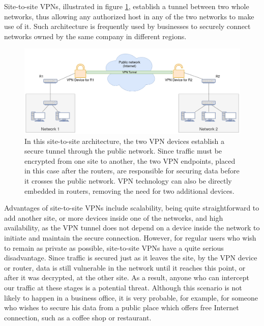 \documentclass[a4paper,12pt]{report}
\begin{document}
		Site-to-site VPNs, illustrated in figure \ref{fig:site-to-site_VPN}, establish a tunnel between two whole networks, thus allowing any authorized host in any of the two networks to make use of it. Such architecture is frequently used by businesses to securely connect networks owned by the same company in different regions.
		\begin{figure}[h]
			\includegraphics[width=\textwidth]{site-to-site_VPN}
			\centering
			\caption{In this site-to-site architecture, the two VPN devices establish a secure tunnel through the public network. Since traffic must be encrypted from one site to another, the two VPN endpoints, placed in this case after the routers, are responsible for securing data before it crosses the public network. VPN technology can also be directly embedded in routers, removing the need for two additional devices.}
			\label{fig:site-to-site_VPN}
		\end{figure}
		
		Advantages of site-to-site VPNs include scalability, being quite straightforward to add another site, or more devices inside one of the networks, and high availability, as the VPN tunnel does not depend on a device inside the network to initiate and maintain the secure connection. However, for regular users who wish to remain as private as possible, site-to-site VPNs have a quite serious disadvantage. Since traffic is secured just as it leaves the site, by the VPN device or router, data is still vulnerable in the network until it reaches this point, or after it was decrypted, at the other site. As a result, anyone who can intercept our traffic at these stages is a potential threat. Although this scenario is not likely to happen in a business office, it is very probable, for example, for someone who wishes to secure his data from a public place which offers free Internet connection, such as a coffee shop or restaurant.
		
\end{document}
